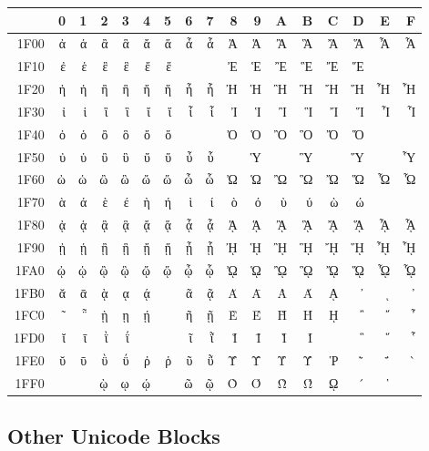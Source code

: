 \documentclass[a4paper]{scrartcl}
\begin{document}
\begin{tabular}{rrrrrrrrrrrrrrrrr}
\toprule
      & 0 & 1 & 2 & 3 & 4 & 5 & 6 & 7 & 8 & 9 & A & B & \textlatin C & D & E & F\\
\midrule
\textlatin{1F00} & ἀ & ἁ & ἂ & ἃ & ἄ & ἅ & ἆ & ἇ & Ἀ & Ἁ & Ἂ & Ἃ & Ἄ & Ἅ & Ἆ & Ἇ\\
\textlatin{1F10} & ἐ & ἑ & ἒ & ἓ & ἔ & ἕ &   &   & Ἐ & Ἑ & Ἒ & Ἓ & Ἔ & Ἕ &   &  \\
\textlatin{1F20} & ἠ & ἡ & ἢ & ἣ & ἤ & ἥ & ἦ & ἧ & Ἠ & Ἡ & Ἢ & Ἣ & Ἤ & Ἥ & Ἦ & Ἧ\\
\textlatin{1F30} & ἰ & ἱ & ἲ & ἳ & ἴ & ἵ & ἶ & ἷ & Ἰ & Ἱ & Ἲ & Ἳ & Ἴ & Ἵ & Ἶ & Ἷ\\
\textlatin{1F40} & ὀ & ὁ & ὂ & ὃ & ὄ & ὅ &   &   & Ὀ & Ὁ & Ὂ & Ὃ & Ὄ & Ὅ &   &  \\
\textlatin{1F50} & ὐ & ὑ & ὒ & ὓ & ὔ & ὕ & ὖ & ὗ &   & Ὑ &   & Ὓ &   & Ὕ &   & Ὗ\\
\textlatin{1F60} & ὠ & ὡ & ὢ & ὣ & ὤ & ὥ & ὦ & ὧ & Ὠ & Ὡ & Ὢ & Ὣ & Ὤ & Ὥ & Ὦ & Ὧ\\
\textlatin{1F70} & ὰ & ά & ὲ & έ & ὴ & ή & ὶ & ί & ὸ & ό & ὺ & ύ & ὼ & ώ &   &  \\
\textlatin{1F80} & ᾀ & ᾁ & ᾂ & ᾃ & ᾄ & ᾅ & ᾆ & ᾇ & ᾈ & ᾉ & ᾊ & ᾋ & ᾌ & ᾍ & ᾎ & ᾏ\\
\textlatin{1F90} & ᾐ & ᾑ & ᾒ & ᾓ & ᾔ & ᾕ & ᾖ & ᾗ & ᾘ & ᾙ & ᾚ & ᾛ & ᾜ & ᾝ & ᾞ & ᾟ\\
\textlatin{1FA0} & ᾠ & ᾡ & ᾢ & ᾣ & ᾤ & ᾥ & ᾦ & ᾧ & ᾨ & ᾩ & ᾪ & ᾫ & ᾬ & ᾭ & ᾮ & ᾯ\\
\textlatin{1FB0} & ᾰ & ᾱ & ᾲ & ᾳ & ᾴ &   & ᾶ & ᾷ & Ᾰ & Ᾱ & Ὰ & Ά & ᾼ & ᾽ & ι & ᾿\\
\textlatin{1FC0} & ῀ & ῁ & ῂ & ῃ & ῄ &   & ῆ & ῇ & Ὲ & Έ & Ὴ & Ή & ῌ & ῍ & ῎ & ῏\\
\textlatin{1FD0} & ῐ & ῑ & ῒ & ΐ &   &   & ῖ & ῗ & Ῐ & Ῑ & Ὶ & Ί &   & ῝ & ῞ & ῟\\
\textlatin{1FE0} & ῠ & ῡ & ῢ & ΰ & ῤ & ῥ & ῦ & ῧ & Ῠ & Ῡ & Ὺ & Ύ & Ῥ & ῭ & ΅ & `\\
\textlatin{1FF0} &   &   & ῲ & ῳ & ῴ &   & ῶ & ῷ & Ὸ & Ό & Ὼ & Ώ & ῼ & ´ & ῾ &  \\
\bottomrule
\end{tabular}


\subsection{Other Unicode Blocks}
\end{document}
